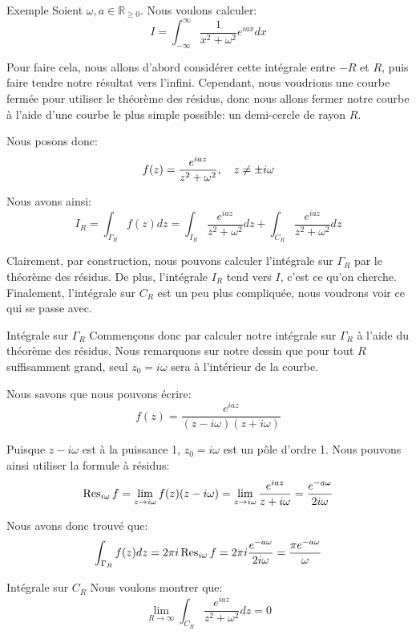 \documentclass[a4paper]{article}
\begin{document}
\begin{parag}{Exemple}
    Soient $\omega, a \in \mathbb{R}_{\geq 0}$. Nous voulons calculer: 
    \[I = \int_{-\infty}^{\infty} \frac{1}{x^2 + \omega^2} e^{iax}dx\]
    
    Pour faire cela, nous allons d'abord considérer cette intégrale entre $-R$ et $R$, puis faire tendre notre résultat vers l'infini. Cependant, nous voudrions une courbe fermée pour utiliser le théorème des résidus, donc nous allons fermer notre courbe à l'aide d'une courbe le plus simple possible: un demi-cercle de rayon $R$.
    
    Nous posons donc: 
    \[f\left(z\right) = \frac{e^{i a z}}{z^2 + \omega^2}, \mathspace z \neq \pm i \omega\]
    
    Nous avons ainsi: 
    \[I_R = \int_{\Gamma_R} f\left(z\right)dz = \int_{I_R} \frac{e^{i a z}}{z^2 + \omega^2} dz + \int_{C_R} \frac{e^{i a z}}{z^2 + \omega^2} dz\]
    
    Clairement, par construction, nous pouvons calculer l'intégrale sur $\Gamma_R$ par le théorème des résidus. De plus, l'intégrale $I_R$ tend vers $I$, c'est ce qu'on cherche. Finalement, l'intégrale sur $C_R$ est un peu plus compliquée, nous voudrons voir ce qui se passe avec.

    \begin{subparag}{Intégrale sur $\Gamma_R$}
        Commençons donc par calculer notre intégrale sur $\Gamma_R$ à l'aide du théorème des résidus. Nous remarquons sur notre dessin que pour tout $R$ suffisamment grand, seul $z_0 = i \omega$ sera à l'intérieur de la courbe. 

        Nous savons que nous pouvons écrire: 
        \[f\left(z\right) = \frac{e^{i a z}}{\left(z - i \omega\right)\left(z + i \omega\right)}\]

        Puisque $z - i\omega$ est à la puissance 1, $z_0 = i \omega$ est un pôle d'ordre 1. Nous pouvons ainsi utiliser la formule à résidus: 
        \[\Res_{i \omega} f = \lim_{z \to i\omega}  f\left(z\right)\left(z - i\omega\right) = \lim_{z \to i \omega} \frac{e^{i a z}}{z + i\omega} = \frac{e^{-a \omega}}{2i \omega}\]
        
        Nous avons donc trouvé que: 
        \[\int_{\Gamma_R} f\left(z\right)dz = 2\pi i \Res_{i \omega} f = 2\pi i \frac{e^{-a \omega}}{2 i \omega} = \frac{\pi e^{-a \omega}}{\omega}\]
    \end{subparag}

    \begin{subparag}{Intégrale sur $C_R$}
        Nous voulons montrer que: 
        \[\lim_{R \to \infty} \int_{C_R} \frac{e^{i a z}}{z^2 + \omega^2} dz = 0\]
        

\end{subparag}
\end{parag}
\end{document}
